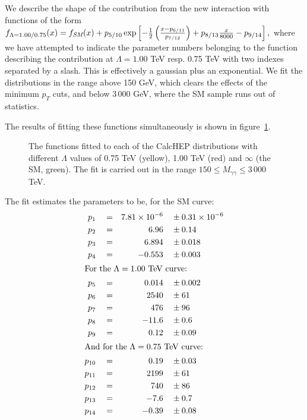 We describe the shape of the contribution from the new interaction with functions of the form
\(f_{\Lambda=1.00/0.75}(x)=f_\textit{SM}(x)+p_{5/10}\exp\left[-\frac{1}{2}\left(\frac{x-p_{6/11}}{p_{7/12}}\right)+p_{8/13}\frac{x}{8000}-p_{9/14}\right],\)
where we have attempted to indicate the parameter numbers belonging to the function describing the contribution at $\Lambda=1.00$ TeV resp. 0.75 TeV with two indexes separated by a slash. This is effectively a gaussian plus an exponential. We fit the distributions in the range above 150 GeV, which clears the effects of the minimum $p_T$ cuts, and below 3\,000 GeV, where the SM sample runs out of statistics.

The results of fitting these functions simultaneously is shown in figure~\ref{simfit}.


\begin{figure}[hbt]
\begin{infilsf}\tiny

\end{infilsf}
\caption{The functions fitted to each of the CalcHEP distributions with different $\Lambda$ values of 0.75 TeV (yellow), 1.00 TeV (red) and $\infty$ (the SM, green). The fit is carried out in the range $150 \le M_{\gamma\gamma} \le 3\,000$ TeV.}\label{simfit}
\end{figure}

The fit estimates the parameters to be, for the SM curve:\allowdisplaybreaks
\begin{align*}
p_1                      & \quad = &  7.81\times10^{-6}   \quad & \pm    0.31\times10^{-6} \\
p_2                      & \quad = &      6.96   \quad & \pm    0.14    \\
p_3                      & \quad = &      6.894   \quad & \pm    0.018    \\
p_4                      & \quad = &    -0.553   \quad & \pm    0.003  \\
\intertext{For the $\Lambda = 1.00$ TeV curve:}
p_5                      & \quad = &     0.014   \quad & \pm    0.002  \\
p_6                      & \quad = &      2540   \quad & \pm    61     \\
p_7                      & \quad = &      476   \quad & \pm    96     \\
p_8                      & \quad = &     -11.6   \quad & \pm    0.6   \\
p_9                      & \quad = &     0.12   \quad & \pm    0.09   \\
\intertext{And for the $\Lambda=0.75$ TeV curve:}
p_{10}                     & \quad = &     0.19   \quad & \pm    0.03   \\
p_{11}                     & \quad = &      2199   \quad & \pm    61     \\
p_{12}                     & \quad = &      740   \quad & \pm    86     \\
p_{13}                     & \quad = &     -7.6   \quad & \pm    0.7    \\
p_{14}                     & \quad = &    -0.39   \quad & \pm    0.08   
\end{align*}

